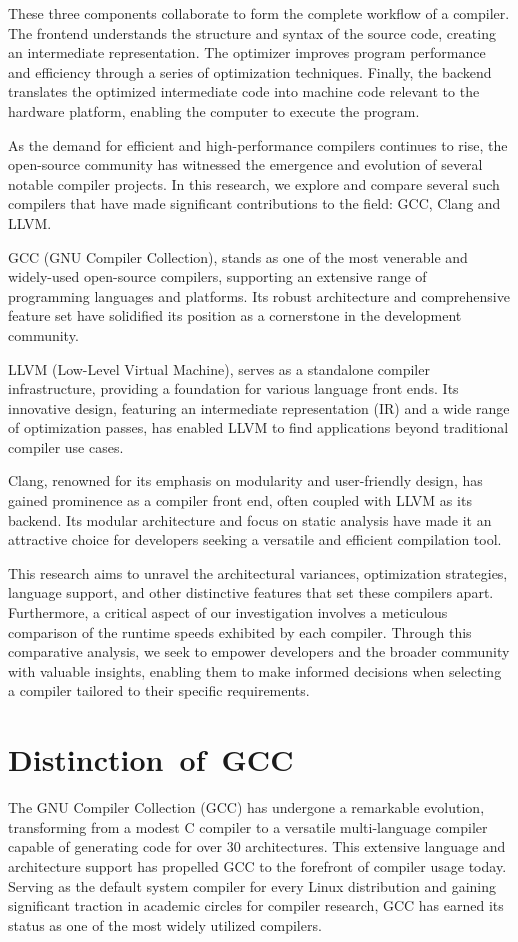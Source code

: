 \documentclass[conference]{IEEEtran}
\begin{document}
These three components collaborate to form the complete workflow of a compiler. The frontend understands the structure and syntax of the source code, creating an intermediate representation. The optimizer improves program performance and efficiency through a series of optimization techniques. Finally, the backend translates the optimized intermediate code into machine code relevant to the hardware platform, enabling the computer to execute the program.

As the demand for efficient and high-performance compilers continues to rise, the open-source community has witnessed the emergence and evolution of several notable compiler projects. In this research, we explore and compare several such compilers that have made significant contributions to the field: GCC, Clang and LLVM.

GCC (GNU Compiler Collection), stands as one of the most venerable and widely-used open-source compilers, supporting an extensive range of programming languages and platforms. Its robust architecture and comprehensive feature set have solidified its position as a cornerstone in the development community.

LLVM (Low-Level Virtual Machine), serves as a standalone compiler infrastructure, providing a foundation for various language front ends. Its innovative design, featuring an intermediate representation (IR) and a wide range of optimization passes, has enabled LLVM to find applications beyond traditional compiler use cases.

Clang, renowned for its emphasis on modularity and user-friendly design, has gained prominence as a compiler front end, often coupled with LLVM as its backend. Its modular architecture and focus on static analysis have made it an attractive choice for developers seeking a versatile and efficient compilation tool.

This research aims to unravel the architectural variances, optimization strategies, language support, and other distinctive features that set these compilers apart. Furthermore, a critical aspect of our investigation involves a meticulous comparison of the runtime speeds exhibited by each compiler. Through this comparative analysis, we seek to empower developers and the broader community with valuable insights, enabling them to make informed decisions when selecting a compiler tailored to their specific requirements.

\section{Distinction of GCC}
The GNU Compiler Collection (GCC) has undergone a remarkable evolution, transforming from a modest C compiler to a versatile multi-language compiler capable of generating code for over 30 architectures. This extensive language and architecture support has propelled GCC to the forefront of compiler usage today. Serving as the default system compiler for every Linux distribution and gaining significant traction in academic circles for compiler research, GCC has earned its status as one of the most widely utilized compilers.
\end{document}
